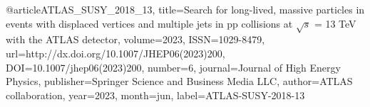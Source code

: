 @article{ATLAS_SUSY_2018_13, 
    title={Search for long-lived, massive particles in events with displaced vertices and multiple jets in pp collisions at $ \sqrt{s} $ = 13 TeV with the ATLAS detector}, 
    volume={2023}, 
    ISSN={1029-8479}, 
    url={http://dx.doi.org/10.1007/JHEP06(2023)200}, 
    DOI={10.1007/jhep06(2023)200}, 
    number={6}, 
    journal={Journal of High Energy Physics}, 
    publisher={Springer Science and Business Media LLC}, 
    author={ATLAS collaboration}, 
    year={2023}, 
    month=jun,
    label={ATLAS-SUSY-2018-13}
}
